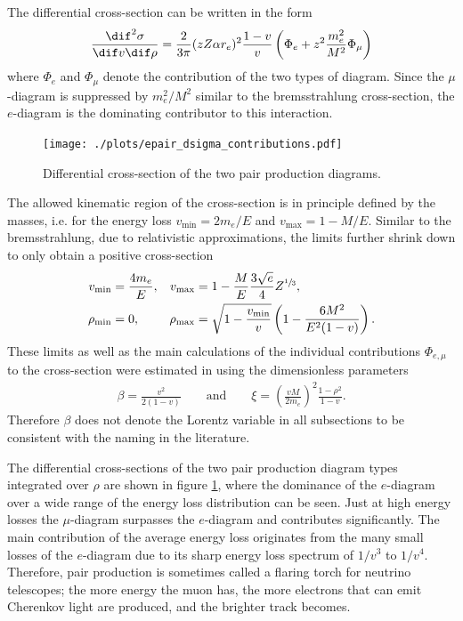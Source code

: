 The differential cross-section can be written in the form
\begin{align} \label{eq:epair_dsigma}
    \frac{\dif^2 \sigma}{\dif v \dif \rho} = \frac{2}{3\pi} (zZ \alpha r_e)^2 \frac{1-v}{v} \left(\Phi_e + z^2\frac{m_e^2}{M^2} \Phi_\mu \right)
\end{align}
where $\Phi_e$ and $\Phi_\mu$ denote the contribution of the two types of diagram.
Since the $\mu$-diagram is suppressed by $m_e^2/M^2$ similar to the bremsstrahlung cross-section, the $e$-diagram is the dominating contributor to this interaction.
\begin{figure}
    \centering
    \texttt{[image: ./plots/epair\_dsigma\_contributions.pdf]}
    \caption{Differential cross-section of the two pair production diagrams.}
    \label{fig:epair_dsigma}
\end{figure}

The allowed kinematic region of the cross-section is in principle defined by the masses, i.e. for the energy loss $v_{\text{min}}=2m_e/E$ and $v_{\text{max}}=1-M/E$.
Similar to the bremsstrahlung, due to relativistic approximations, the limits further shrink down to only obtain a positive cross-section
\begin{align} \label{eq:epair_v_rho_limits}
    v_{\text{min}} &= \frac{4m_e}{E},
    & v_{\text{max}} &= 1 - \frac{M}{E} \frac{3\sqrt{e}}{4}Z^{\sfrac13},
    \\
    \rho_{\text{min}} &= 0,
    & \rho_{\text{max}} &= \sqrt{1 - \frac{v_{\text{min}}}{v}} \left( 1 - \frac{6 M^2}{E^2(1 - v)} \right) .
\end{align}
These limits as well as the main calculations of the individual contributions $\Phi_{e,\mu}$ to the cross-section were estimated in \cite{Kokoulin69, Kokoulin71} using the dimensionless parameters
\begin{align} \label{eq:pair_beta_xi}
    \beta = \frac{v^2}{2(1 - v)}
    \qquad
    \text{and}
    \qquad
    \xi = \left( \frac{vM}{2m_e} \right)^2 \frac{1 - \rho^2}{1 - v} .
\end{align}
Therefore $\beta$ does not denote the Lorentz variable in all subsections to be consistent with the naming in the literature.

The differential cross-sections of the two pair production diagram types integrated over $\rho$ are shown in figure \ref{fig:epair_dsigma}, where the dominance of the $e$-diagram over a wide range of the energy loss distribution can be seen.
Just at high energy losses the $\mu$-diagram surpasses the $e$-diagram and contributes significantly.
The main contribution of the average energy loss originates from the many small losses of the $e$-diagram due to its sharp energy loss spectrum of $1/v^3$ to $1/v^4$.
Therefore, pair production is sometimes called a flaring torch for neutrino telescopes; the more energy the muon has, the more electrons that can emit Cherenkov light are produced, and the brighter track becomes.

